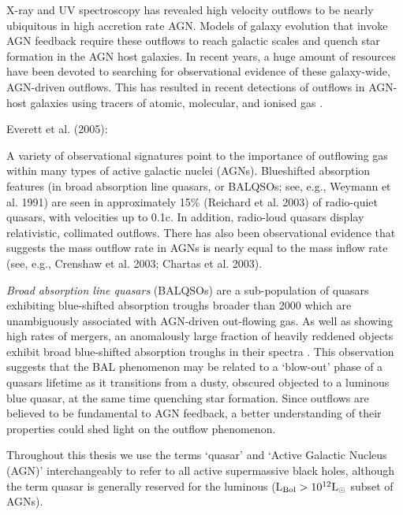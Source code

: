 X-ray and UV spectroscopy has revealed high velocity outflows to be nearly ubiquitous in high accretion rate AGN.
Models of galaxy evolution that invoke AGN feedback require these outflows to reach galactic scales and quench star formation in the AGN host galaxies. 
In recent years, a huge amount of resources have been devoted to searching for observational evidence of these galaxy-wide, AGN-driven outflows. 
This has resulted in recent detections of outflows in AGN-host galaxies using tracers of atomic, molecular, and ionised gas \citep[e.g.][]{nesvadba06,arav08,nesvadba08,moe09,dunn10,alexander10,harrison12,harrison14,nesvadba10,rupke13,veilleux13,nardini15,feruglio10,alatalo11,cimatti13,cicone14}.  

Everett et al. (2005): 

A variety of observational signatures point to the importance of outflowing gas within many types of active galactic nuclei (AGNs). 
Blueshifted absorption features (in broad absorption line quasars, or BALQSOs; see, e.g., Weymann et al. 1991) are seen in approximately 15\% (Reichard et al. 2003) of radio-quiet quasars, with velocities up to 0.1c. In addition, radio-loud quasars display relativistic, collimated outflows. 
There has also been observational evidence that suggests the mass outflow rate in AGNs is nearly equal to the mass inflow rate (see, e.g., Crenshaw et al. 2003; Chartas et al. 2003).

{\it Broad absorption line quasars} (BALQSOs) are a sub-population of quasars exhibiting blue-shifted absorption troughs broader than 2000 \kms \citep{weymann91} which are unambiguously associated with AGN-driven out-flowing gas. 
As well as showing high rates of mergers, an anomalously large fraction of heavily reddened objects exhibit broad blue-shifted absorption troughs in their spectra \citep{urrutia09, glikman12}. 
This observation suggests that the BAL phenomenon may be related to a `blow-out' phase of a quasars lifetime as it transitions from a dusty, obscured objected to a luminous blue quasar, at the same time quenching star formation. 
Since outflows are believed to be fundamental to AGN feedback, a better understanding of their properties could shed light on the outflow phenomenon. 


Throughout this thesis we use the terms `quasar' and `Active Galactic Nucleus (AGN)' interchangeably to refer to all active supermassive black holes, although the term quasar is generally reserved for the luminous (L$_{\rm Bol} > 10^{12}{\rm L}_{\odot}$ subset of AGNs).

